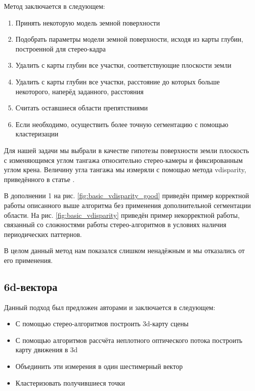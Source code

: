 \documentclass[aps,%
14pt,%
final,%
oneside,
onecolumn,%
musixtex, %
superscriptaddress,%
centertags]{extarticle} %
\begin{document}
Метод заключается в следующем:
\begin{enumerate}
    \item Принять некоторую модель земной поверхности
    \item Подобрать параметры модели земной поверхности, исходя из карты глубин, построенной для стерео-кадра
    \item Удалить с карты глубин все участки, соответствующие плоскости земли
    \item Удалить с карты глубин все участки, расстояние до которых больше некоторого, наперёд заданного, расстояния
    \item Считать оставшиеся области препятствиями
    \item Если необходимо, осуществить более точную сегментацию с помощью кластеризации
\end{enumerate}

Для нашей задачи мы выбрали в качестве гипотезы поверхности земли плоскость с изменяющимся углом тангажа относительно стерео-камеры и фиксированным углом крена. Величину угла тангажа мы измеряли с помощью метода vdisparity, приведённого в статье \cite{labayrade2002real}.

В дополнении 1 на рис. \ref{fig:basic_vdisparity_good} приведён пример корректной работы описанного выше алгоритма без применения дополнительной сегментации области. На рис. \ref{fig:basic_vdisparity} приведён пример некорректной работы, связанный со сложностями работы стерео-алгоритмов в условиях наличия периодических паттернов. 

В целом данный метод нам показался слишком ненадёжным и мы отказались от его применения.

\subsection{ 6d-вектора }

Данный подход был предложен авторами \cite{franke20056d} и заключается в следующем:
\begin{itemize}
     \item С помощью стерео-алгоритмов построить 3d-карту сцены
     \item С помощью алгоритмов рассчёта неплотного оптического потока построить карту движения в 3d
     \item Объединить эти измерения в один шестимерный вектор
     \item Кластеризовать получившиеся точки
\end{itemize}
\end{document}
